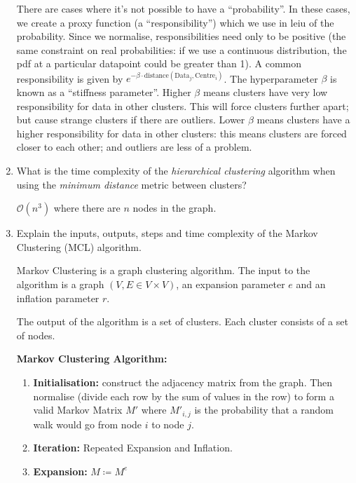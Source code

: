 \documentclass[10pt,\jkfside,a4paper]{article}
\begin{document}
\begin{enumerate}
    There are cases where it's not possible to have a ``probability''. In these cases, we create a proxy function (a ``responsibility'') which we use in leiu of the probability. Since we normalise,
    responsibilities need only to be positive (the same constraint on real probabilities: if we use a continuous distribution, the pdf at a particular datapoint could be greater than 1). A common responsibility
    is given by $e^{-\beta \cdot \mathrm{distance}(\mathrm{Data}_j, \mathrm{Centre}_i)}$. The hyperparameter $\beta$ is known as a ``stiffness parameter''. Higher $\beta$ means clusters have very low
    responsibility for data in other clusters. This will force clusters further apart; but cause strange clusters if there are outliers. Lower $\beta$ means clusters have a higher responsibility for data in
    other clusters: this means clusters are forced closer to each other; and outliers are less of a problem.

    \item What is the time complexity of the \textit{hierarchical clustering} algorithm when using the \textit{minimum distance} metric between clusters?

    $\mathcal O(n^3)$ where there are $n$ nodes in the graph.

    \item Explain the inputs, outputs, steps and time complexity of the Markov Clustering (MCL) algorithm.

    Markov Clustering is a graph clustering algorithm. The input to the algorithm is a graph $(V, E \in V \times V)$, an expansion parameter $e$ and an inflation parameter $r$.

    The output of the algorithm is a set of clusters. Each cluster consists of a set of nodes.

    \textbf{Markov Clustering Algorithm:}

    \begin{enumerate}

        \item \textbf{Initialisation:} construct the adjacency matrix from the graph. Then normalise (divide each row by the sum of values in the row) to form a valid Markov Matrix $M'$ where $M'_{i, j}$ is the
        probability that a random walk would go from node $i$ to node $j$.

        \item \textbf{Iteration:} Repeated Expansion and Inflation.

        \item \textbf{Expansion:} $M \coloneqq M^e$


\end{enumerate}
\end{enumerate}
\end{document}
